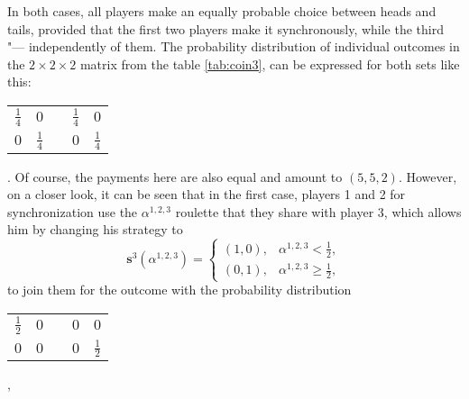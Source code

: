 In both cases, all players make an equally probable choice between heads and tails, provided that the first two players make it synchronously, while the third "--- independently of them. The probability distribution of individual outcomes in the $2 \times 2 \times 2$ matrix from the table \ref{tab:coin3}, can be expressed for both sets like this: %
\begin{tabular}{ |c|c|c|c|c| }
	\cline{1-2} \cline{4-5}
	$\frac{1}{4}$ &
	$0$ & \qquad &
	$\frac{1}{4}$ &
	$0$ \\
	\cline{1-2} \cline{4-5}
	$0$ &
	$\frac{1}{4}$ & \qquad &
	$0$ &
	$\frac{1}{4}$ \\
	\cline{1-2} \cline{4-5}
\end{tabular}.
Of course, the payments here are also equal and amount to $(5, 5, 2)$. However, on a closer look, it can be seen that in the first case, players 1 and 2 for synchronization use the $\alpha^{1, 2, 3}$ roulette that they share with player 3, which allows him by changing his strategy to %
\begin{equation*}
	\mathbf{s}^3(\alpha^{1, 2, 3}) = \begin{cases}
		(1, 0), & \alpha^{1, 2, 3} < \frac{1}{2},\\
		(0, 1), & \alpha^{1, 2, 3} \ge \frac{1}{2},
	\end{cases}
\end{equation*}
to join them for the outcome with the probability distribution %
\begin{tabular}{ |c|c|c|c|c| }
	\cline{1-2} \cline{4-5}
	$\frac{1}{2}$ &
	$0$ & \qquad &
	$0$ &
	$0$ \\
	\cline{1-2} \cline{4-5}
	$0$ &
	$0$ & \qquad &
	$0$ &
	$\frac{1}{2}$ \\
	\cline{1-2} \cline{4-5}
\end{tabular},
